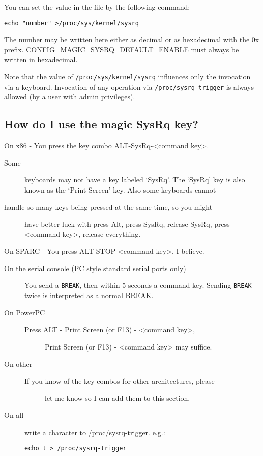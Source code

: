 You can set the value in the file by the following command:

\begin{verbatim}
echo "number" >/proc/sys/kernel/sysrq
\end{verbatim}

The number may be written here either as decimal or as hexadecimal with
the 0x prefix. CONFIG\_MAGIC\_SYSRQ\_DEFAULT\_ENABLE must always be
written in hexadecimal.

Note that the value of \texttt{/proc/sys/kernel/sysrq} influences only
the invocation via a keyboard. Invocation of any operation via
\texttt{/proc/sysrq-trigger} is always allowed (by a user with admin
privileges).

\subsection{How do I use the magic SysRq
key?}\label{how-do-i-use-the-magic-sysrq-key}

On x86 - You press the key combo
ALT-SysRq-\textless{}command key\textgreater{}.

\begin{description}
\item[Some]
keyboards may not have a key labeled `SysRq'. The `SysRq' key is also
known as the `Print Screen' key. Also some keyboards cannot
\item[handle so many keys being pressed at the same time, so you might]
have better luck with press Alt, press SysRq, release SysRq, press
\textless{}command key\textgreater{}, release everything.
\end{description}

On SPARC - You press ALT-STOP-\textless{}command key\textgreater{}, I
believe.

\begin{description}
\item[On the serial console (PC style standard serial ports only)]
You send a \texttt{BREAK}, then within 5 seconds a command key. Sending
\texttt{BREAK} twice is interpreted as a normal BREAK.
\item[On PowerPC]
\begin{description}
\item[Press ALT - Print Screen (or F13) -
\textless{}command key\textgreater{},]
Print Screen (or F13) - \textless{}command key\textgreater{} may
suffice.
\end{description}
\item[On other]
\begin{description}
\item[If you know of the key combos for other architectures, please]
let me know so I can add them to this section.
\end{description}
\item[On all]
write a character to /proc/sysrq-trigger. e.g.:

\begin{verbatim}
echo t > /proc/sysrq-trigger
\end{verbatim}
\end{description}

